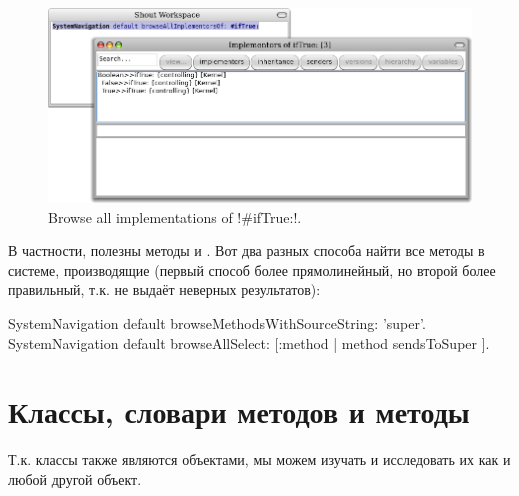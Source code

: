 \documentclass[a4paper,10pt,twoside]{book}
\begin{document}
\begin{figure}[ht]\centering
	\includegraphics[width=\linewidth]{implementors}
	\caption{Browse all implementations of \ct!\#ifTrue:!.}
\end{figure}

В частности, полезны методы  и . Вот два разных способа найти все методы в системе, производящие  (первый способ более прямолинейный, но второй более правильный, т.к. не выдаёт неверных результатов):
\begin{code}{}
SystemNavigation default browseMethodsWithSourceString: 'super'.
SystemNavigation default browseAllSelect: [:method | method sendsToSuper ].
\end{code}

\section{Классы, словари методов и методы}

Т.к. классы также являются объектами, мы можем изучать и исследовать их как и любой другой объект.

\end{document}
